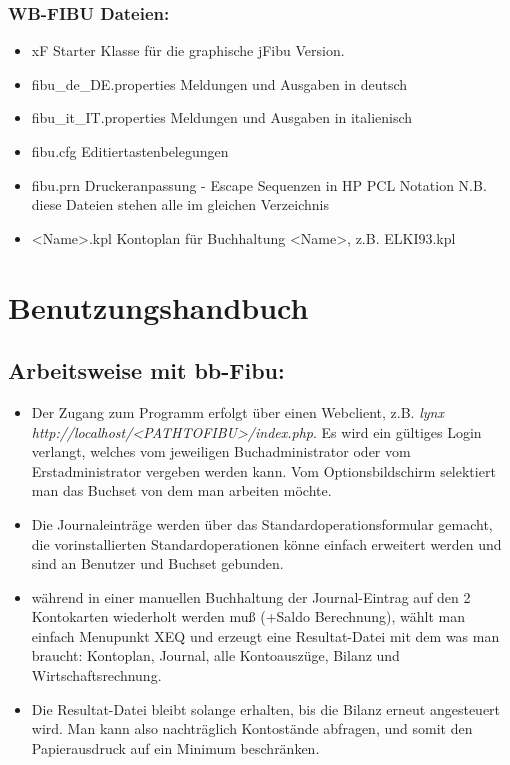 \documentclass[12pt]{report}
\begin{document}
\subsection{WB-FIBU Dateien:}

\begin{itemize}

\item  xF     Starter Klasse für die graphische jFibu Version.

\item  fibu\_de\_DE.properties    Meldungen und Ausgaben in deutsch

\item  fibu\_it\_IT.properties    Meldungen und Ausgaben in italienisch

\item  fibu.cfg   Editiertastenbelegungen

\item  fibu.prn   Druckeranpassung - Escape Sequenzen in HP PCL Notation N.B.
diese Dateien stehen alle im gleichen Verzeichnis

\item  <Name>.kpl   Kontoplan für Buchhaltung <Name>, z.B. ELKI93.kpl
\end{itemize}

\chapter{Benutzungshandbuch}

\section{Arbeitsweise mit bb-Fibu:}

\begin{itemize}

\item Der Zugang zum Programm erfolgt über einen Webclient, z.B. {\em lynx
    http://localhost/<PATHTOFIBU>/index.php}. Es wird ein gültiges Login verlangt, welches vom jeweiligen Buchadministrator oder vom Erstadministrator vergeben werden kann. Vom Optionsbildschirm selektiert man das Buchset von dem man arbeiten möchte.

\item Die Journaleinträge werden über das Standardoperationsformular gemacht, die vorinstallierten Standardoperationen könne einfach erweitert werden und sind an Benutzer und Buchset gebunden.

\item während in einer manuellen Buchhaltung der Journal-Eintrag auf den 2
Kontokarten wiederholt werden muß (+Saldo Berechnung), wählt man einfach
Menupunkt XEQ und erzeugt eine Resultat-Datei mit dem was man braucht:
Kontoplan, Journal, alle Kontoauszüge, Bilanz und Wirtschaftsrechnung.

\item Die Resultat-Datei bleibt solange erhalten, bis die Bilanz erneut
angesteuert wird. Man kann also nachträglich Kontostände abfragen, und somit
den Papierausdruck auf ein Minimum beschränken.

\end{itemize}
\end{document}
